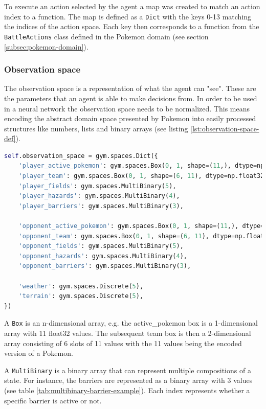 To execute an action selected by the agent a map was created to match an action index to a function. The map is defined as a \lstinline|Dict| with the keys
0-13 matching the indices of the action space. Each key then corresponds to a function from the \lstinline|BattleActions|
class defined in the Pokemon domain (see section \ref{subsec:pokemon-domain}).

\subsubsection{Observation space}
The observation space is a representation of what the agent can "see". These are the parameters that an agent is able to make
decisions from. In order to be used in a neural network the observation space needs to be normalized. This means encoding the
abstract domain space presented by Pokemon into easily processed structures like numbers, lists and binary arrays (see listing \ref{lst:observation-space-def}).

\begin{lstlisting}[basicstyle=\fontsize{10}{10}\selectfont\ttfamily,language=Python,caption={The shape of the observation space.},label=lst:observation-space-def,breaklines]
self.observation_space = gym.spaces.Dict({
    'player_active_pokemon': gym.spaces.Box(0, 1, shape=(11,), dtype=np.float32),
    'player_team': gym.spaces.Box(0, 1, shape=(6, 11), dtype=np.float32),
    'player_fields': gym.spaces.MultiBinary(5),
    'player_hazards': gym.spaces.MultiBinary(4),
    'player_barriers': gym.spaces.MultiBinary(3),

    'opponent_active_pokemon': gym.spaces.Box(0, 1, shape=(11,), dtype=np.float32),
    'opponent_team': gym.spaces.Box(0, 1, shape=(6, 11), dtype=np.float32),
    'opponent_fields': gym.spaces.MultiBinary(5),
    'opponent_hazards': gym.spaces.MultiBinary(4),
    'opponent_barriers': gym.spaces.MultiBinary(3),

    'weather': gym.spaces.Discrete(5),
    'terrain': gym.spaces.Discrete(5),
})
\end{lstlisting}

A \lstinline|Box| is an n-dimensional array, e.g. the active\_pokemon box is a 1-dimensional array with 11 float32 values.
The subsequent team box is then a 2-dimensional array consisting of 6 slots of 11 values with the 11 values being the encoded
version of a Pokemon.

A \lstinline|MultiBinary| is a binary array that can represent multiple compositions of a state. For instance, the barriers are
represented as a binary array with 3 values (see table \ref{tab:multibinary-barrier-example}). Each index represents whether a specific barrier is active or not.


